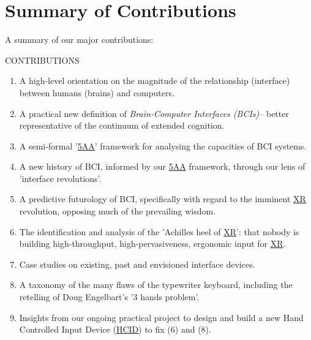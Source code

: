 \documentclass[logo,bsc,singlespacing,parskip]{infthesis}
\begin{document}
\chapter*{Summary of Contributions}
\label{sec:orgaa4d7e6}
A summary of our major contributions:
\begin{mdframed}
\begin{description}
\item[{CONTRIBUTIONS}] 
\end{description}


\begin{enumerate}
\item A high-level orientation on the magnitude of the relationship (interface) between humans (brains) and computers.

\item A practical new definition of \emph{Brain-Computer Interfaces (BCIs)}--  better representative of the continuum of extended cognition.

\item A semi-formal '\hyperref[org2644eb5]{5AA}' framework for analysing the capacities of BCI systems.

\item A new history of BCI, informed by our \hyperref[org2644eb5]{5AA} framework, through our lens of 'interface revolutions'.

\item A predictive futurology of BCI, specifically with regard to the imminent \hyperref[org39cbd51]{XR} revolution, opposing much of the prevailing wisdom.

\item The identification and analysis of the 'Achilles heel of \hyperref[org39cbd51]{XR}': that nobody is building high-throughput, high-pervasiveness, ergonomic input for \hyperref[org39cbd51]{XR}.

\item Case studies on existing, past and envisioned interface devices.

\item A taxonomy of the many flaws of the typewriter keyboard, including the retelling of Doug Engelbart's '3 hands problem'.

\item Insights from our ongoing practical project to design and build a new Hand Controlled Input Device (\hyperref[org0c83164]{HCID}) to fix (6) and (8).
\end{enumerate}
\medskip
\end{mdframed}
\end{document}
